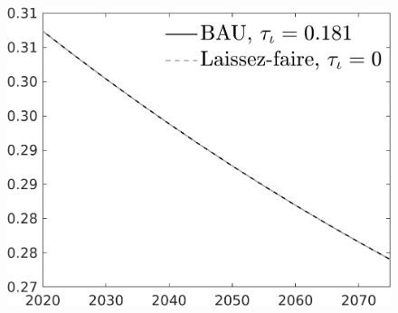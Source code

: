 \documentclass[12pt]{article}
\begin{document}
\begin{figure}[h!!]
\begin{minipage}[]{0.32\textwidth}
	\end{minipage}	
	\begin{minipage}[]{0.32\textwidth}
		\includegraphics[width=1\textwidth]{../../codding_model/own_basedOnFried/optimalPol_010922_revision/figures/all_13Sept22/CompTaul_LFBAU_Reg0_pf_spillover0_nsk1_xgr1_knspil0_sep1_countec0_GovRev0_etaa0.79_lgd1.png}

\end{minipage}
\end{figure}
\end{document}
